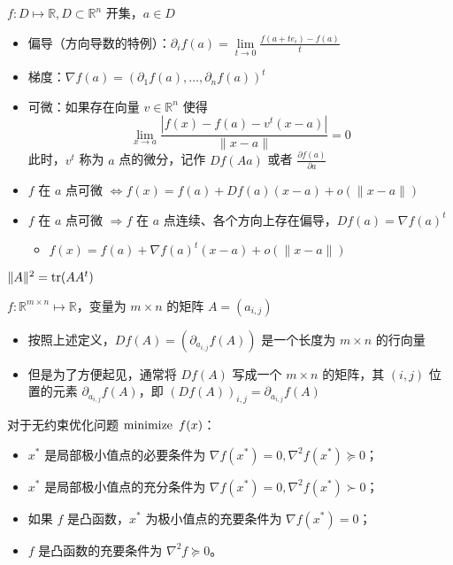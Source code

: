 \begin{remark}
    $f: D \mapsto \mathbb{R}, D \subset \mathbb{R}^n$ 开集，$a \in D$\begin{itemize}
        \item 偏导（方向导数的特例）：$\partial_if(a) = \underset{t \to 0}{\lim}\frac{f(a + te_i) - f(a)}{t}$
        \item 梯度：$\nabla f(a) = (\partial_1f(a), \dots, \partial_nf(a))^t$
        \item 可微：如果存在向量 $v \in \mathbb{R}^n$ 使得\[\lim_{x \to a}\frac{|f(x) - f(a) - v^t(x - a)|}{\|x - a\|} = 0\]此时，$v^t$ 称为 $a$ 点的微分，记作 $Df(Aa)$ 或者 $\frac{\partial f(a)}{\partial a}$
        \item $f$ 在 $a$ 点可微 $\Longleftrightarrow f(x) = f(a) + Df(a)(x - a) + o(\|x - a\|)$
        \item $f$ 在 $a$ 点可微 $\Longrightarrow f$ 在 $a$ 点连续、各个方向上存在偏导，$Df(a) = \nabla f(a)^t$\begin{itemize}
            \item $f(x) = f(a) + \nabla f(a)^t(x - a) + o(\|x - a\|)$
        \end{itemize} 
    \end{itemize}
\end{remark}

\begin{remark}
	$\|A\|^2 = \operatorname{tr}(AA^t)$
\end{remark}

\begin{remark}
    $f: \mathbb{R}^{m \times n} \mapsto \mathbb{R}$，变量为 $m \times n$ 的矩阵 $A = (a_{i, j})$\begin{itemize}
        \item 按照上述定义，$Df(A) = (\partial_{a_{i, j}}f(A))$ 是一个长度为 $m \times n$ 的行向量
        \item 但是为了方便起见，通常将 $Df(A)$ 写成一个 $m \times n$ 的矩阵，其 $(i, j)$ 位置的元素 $\partial_{a_{i, j}}f(A)$，即 $(Df(A))_{i, j} = \partial_{a_{i, j}}f(A)$
    \end{itemize}
\end{remark}

\begin{remark}
	对于无约束优化问题 $\minimize\ f(x)$：
	\begin{itemize}
		\item $x^*$ 是局部极小值点的必要条件为 $\nabla f(x^*) = 0, \nabla^2f(x^*)\succeq 0$；
		\item $x^*$ 是局部极小值点的充分条件为 $\nabla f(x^*) = 0, \nabla^2f(x^*)\succ 0$；
		\item 如果 $f$ 是凸函数，$x^*$ 为极小值点的充要条件为 $\nabla f(x^*) = 0$；
		\item $f$ 是凸函数的充要条件为 $\nabla^2f\succeq 0$。
	\end{itemize}
\end{remark}

